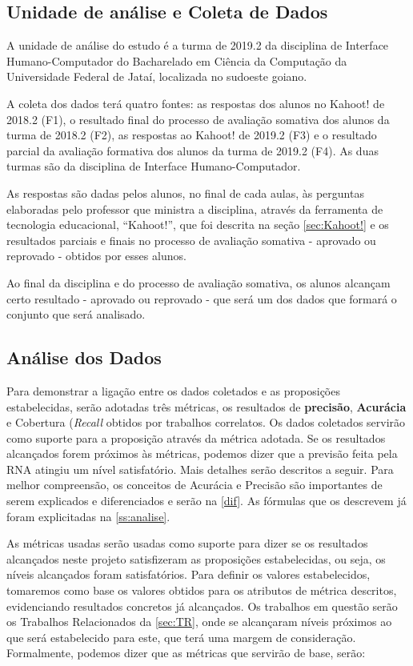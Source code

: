 \documentclass[
	12pt,				%
	openright,			%
	oneside,
	a4paper,			%
	english,			%
	french,				%
	spanish,			%
	brazil,				%
	]{abntex2}
\begin{document}
\subsection{Unidade de análise e Coleta de Dados}
A unidade de análise do estudo é a turma de 2019.2 da disciplina de Interface Humano-Computador do Bacharelado em Ciência da Computação da Universidade Federal de Jataí, localizada no sudoeste goiano.

A coleta dos dados terá quatro fontes: as respostas dos alunos no Kahoot! de 2018.2 (F1), o resultado final do processo de avaliação somativa dos alunos da turma de 2018.2 (F2), as respostas ao Kahoot! de 2019.2 (F3) e o resultado parcial da avaliação formativa dos alunos da turma de 2019.2 (F4). As duas turmas são da disciplina de Interface Humano-Computador. 

As respostas são dadas pelos alunos, no final de cada aulas, às perguntas elaboradas pelo professor que ministra a disciplina, através da ferramenta de tecnologia educacional, ``Kahoot!'', que foi descrita na seção \ref{sec:Kahoot!} e os resultados parciais e finais no processo de avaliação somativa - aprovado ou reprovado - obtidos por esses alunos.

Ao final da disciplina e do processo de avaliação somativa, os alunos alcançam certo resultado - aprovado ou reprovado - que será um dos dados que formará o conjunto que será analisado.

\subsection{Análise dos Dados}
Para demonstrar a ligação entre os dados coletados e as proposições estabelecidas, serão adotadas três métricas, os resultados de \textbf{precisão}, \textbf{Acurácia} e Cobertura (\textit{Recall} obtidos por trabalhos correlatos. Os dados coletados servirão como suporte para a proposição através da métrica adotada. Se os resultados alcançados forem próximos às métricas, podemos dizer que a previsão feita pela RNA atingiu um nível satisfatório. Mais detalhes serão descritos a seguir. Para melhor compreensão, os conceitos de Acurácia e Precisão são importantes de serem explicados e diferenciados e serão na \autoref{dif}. As fórmulas que os descrevem já foram explicitadas na \autoref{ss:analise}.

As métricas usadas serão usadas como suporte para dizer se os resultados alcançados neste projeto satisfizeram as proposições estabelecidas, ou seja, os níveis alcançados foram satisfatórios. Para definir os valores estabelecidos, tomaremos como base os valores obtidos para os atributos de métrica descritos, evidenciando resultados concretos já alcançados. Os trabalhos em questão serão os Trabalhos Relacionados da \autoref{sec:TR}, onde se alcançaram níveis próximos ao que será estabelecido para este, que terá uma margem de consideração. Formalmente, podemos dizer que as métricas que servirão de base, serão:
\end{document}
